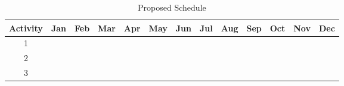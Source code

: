         \begin{table}[H]
        \caption{Proposed Schedule}
        \label{tab:schedule}
        \centering
        \begin{tabular}{|c|cccccccccccc|}
        \hline
        Activity & \textbf{Jan}                                  & \textbf{Feb}                                  & \textbf{Mar}                                  & \textbf{Apr}                                  & \textbf{May}                                  & \textbf{Jun}                                  & \textbf{Jul}                                  & \textbf{Aug}                                  & \textbf{Sep}                                  & \textbf{Oct}                                  & \textbf{Nov}                                  & \textbf{Dec} \\ \hline
        1        & \multicolumn{1}{c|}{\cellcolor[HTML]{000000}} & \multicolumn{1}{c|}{}                         & \multicolumn{1}{c|}{}                         & \multicolumn{1}{c|}{}                         & \multicolumn{1}{c|}{}                         & \multicolumn{1}{c|}{}                         & \multicolumn{1}{c|}{}                         & \multicolumn{1}{c|}{}                         & \multicolumn{1}{c|}{}                         & \multicolumn{1}{c|}{}                         & \multicolumn{1}{c|}{}                         &              \\ \cline{2-13} 
        2        & \multicolumn{1}{c|}{}                         & \multicolumn{1}{c|}{\cellcolor[HTML]{000000}} & \multicolumn{1}{c|}{\cellcolor[HTML]{000000}} & \multicolumn{1}{c|}{}                         & \multicolumn{1}{c|}{}                         & \multicolumn{1}{c|}{}                         & \multicolumn{1}{c|}{}                         & \multicolumn{1}{c|}{}                         & \multicolumn{1}{c|}{}                         & \multicolumn{1}{c|}{}                         & \multicolumn{1}{c|}{}                         &              \\ \cline{2-13} 
        3        & \multicolumn{1}{c|}{}                         & \multicolumn{1}{c|}{}                         & \multicolumn{1}{c|}{\cellcolor[HTML]{000000}} & \multicolumn{1}{c|}{\cellcolor[HTML]{000000}} & \multicolumn{1}{c|}{\cellcolor[HTML]{000000}} & \multicolumn{1}{c|}{}                         & \multicolumn{1}{c|}{}                         & \multicolumn{1}{c|}{}                         & \multicolumn{1}{c|}{}                         & \multicolumn{1}{c|}{}                         & \multicolumn{1}{c|}{}                         &              \\ \cline{2-13} 

\end{tabular}
\end{table}
